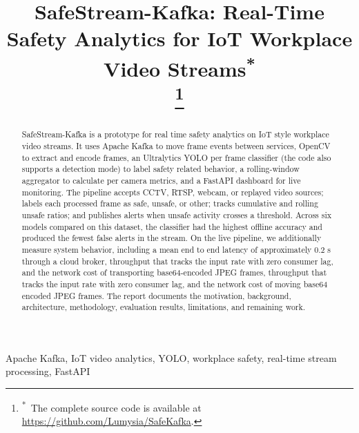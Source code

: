 \documentclass[conference]{IEEEtran}
\begin{document}
\title{SafeStream-Kafka: Real-Time Safety Analytics for IoT Workplace Video Streams\textsuperscript{*}\\
\thanks{\textsuperscript{*}~The complete source code is available at \protect\url{https://github.com/Lumysia/SafeKafka}.}
}

\author{
}

\maketitle
\begin{abstract}
SafeStream-Kafka is a prototype for real time safety analytics on IoT style workplace video streams. It uses Apache Kafka to move frame events between services, OpenCV to extract and encode frames, an Ultralytics YOLO per frame classifier (the code also supports a detection mode) to label safety related behavior, a rolling-window aggregator to calculate per camera metrics, and a FastAPI dashboard for live monitoring. The pipeline accepts CCTV, RTSP, webcam, or replayed video sources; labels each processed frame as safe, unsafe, or other; tracks cumulative and rolling unsafe ratios; and publishes alerts when unsafe activity crosses a threshold. Across six models compared on this dataset, the classifier had the highest offline accuracy and produced the fewest false alerts in the stream. On the live pipeline, we additionally measure system behavior, including a mean end to end latency of approximately 0.2 s through a cloud broker, throughput that tracks the input rate with zero consumer lag, and the network cost of transporting base64-encoded JPEG frames, throughput that tracks the input rate with zero consumer lag, and the network cost of moving base64 encoded JPEG frames. The report documents the motivation, background, architecture, methodology, evaluation results, limitations, and remaining work.
\end{abstract}

\begin{IEEEkeywords}
Apache Kafka, IoT video analytics, YOLO, workplace safety,
real-time stream processing, FastAPI
\end{IEEEkeywords}
\end{document}

